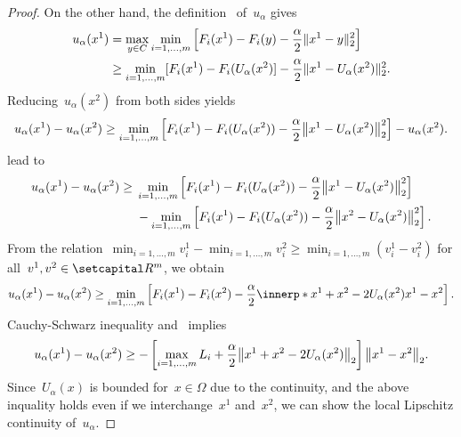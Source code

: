 \documentclass[../../main]{subfiles}
\begin{document}
\begin{proof}
    On the other hand, the definition~ of~$u_\alpha$ gives
    \begin{align}
        u_\alpha(x^1) &= \max_{y \in C} \min_{i = 1, \dots, m} \left[ F_i(x^1) - F_i(y) - \frac{\alpha}{2} \lVert x^1 - y\rVert_2^2 \right] \\
                      &\ge \min_{i = 1, \dots, m} [F_i(x^1) - F_i(U_\alpha(x^2)] - \frac{\alpha}{2} \lVert x^1 - U_\alpha(x^2)\rVert_2^2
    .\end{align}
    Reducing~$u_\alpha(x^2)$ from both sides yields
    \begin{equation}
        u_\alpha(x^1) - u_\alpha(x^2) \ge \min_{i = 1, \dots, m} \left[F_i(x^1) - F_i(U_\alpha(x^2)) - \frac{\alpha}{2} \norm*{x^1 - U_\alpha(x^2)}_2^2\right] - u_\alpha(x^2)
    .\end{equation} 
     lead to
    \begin{align}
        u_\alpha(x^1) - u_\alpha(x^2) \ge{}& \min_{i = 1, \dots, m} \left[F_i(x^1) - F_i(U_\alpha(x^2)) - \frac{\alpha}{2} \norm*{x^1 - U_\alpha(x^2)}_2^2\right] \\
    &- \min_{i = 1, \dots, m} \left[F_i(x^1) - F_i(U_\alpha(x^2)) - \frac{\alpha}{2} \norm*{x^2 - U_\alpha(x^2)}_2^2 \right]
    .\end{align}
    From the relation~$\min_{i = 1, \dots, m} v^1_i - \min_{i = 1, \dots, m} v^2_i \ge \min_{i = 1, \dots, m} (v^1_i - v^2_i)$ for all~$v^1, v^2 \in \setR^m$, we obtain
    \begin{equation}
        u_\alpha(x^1) - u_\alpha(x^2) \ge \min_{i = 1, \dots, m} \left[ F_i(x^1) - F_i(x^2) - \frac{\alpha}{2} \innerp*{x^1 + x^2 - 2 U_\alpha(x^2)}{x^1 - x^2} \right] 
    .\end{equation} 
    Cauchy-Schwarz inequality and~ implies
    \begin{equation}
        u_\alpha(x^1) - u_\alpha(x^2) \ge - \left[ \max_{i = 1, \dots, m} L_i + \frac{\alpha}{2} \norm*{x^1 + x^2 - 2 U_\alpha(x^2)}_2\right] \norm*{x^1 - x^2}_2
    .\end{equation} 
    Since~$U_\alpha(x)$ is bounded for~$x \in \Omega$ due to the continuity, and the above inquality holds even if we interchange~$x^1$ and~$x^2$, we can show the local Lipschitz continuity of~$u_\alpha$.
\end{proof}
\end{document}

